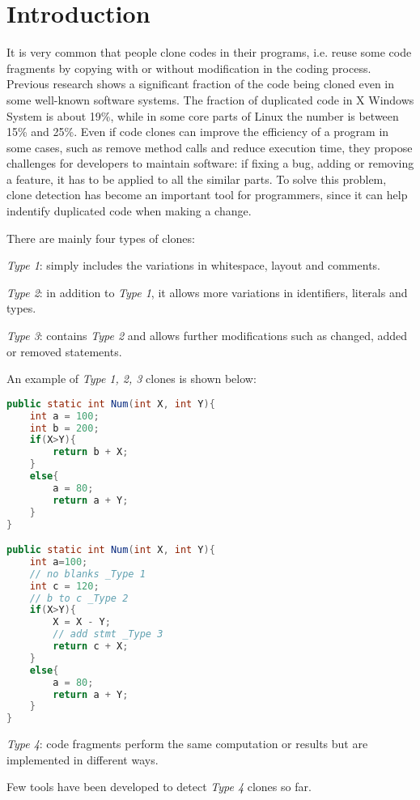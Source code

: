 \documentclass[../main.tex]{subfiles}
\begin{document}
\section{Introduction}

It is very common that people clone codes in their programs, i.e. reuse some code fragments by copying with or without modification in the coding process. 
Previous research shows a significant fraction of the code being cloned even in some well-known software systems. The fraction of duplicated code in X Windows System is about 19\%\cite{cloneinsys1}, while in some core parts of Linux the number is between 15\% and 25\%\cite{cloneinsys2}. 
Even if code clones can improve the efficiency of a program in some cases, such as remove method calls and reduce execution time, they propose challenges for developers to maintain software: if fixing a bug, adding or removing a feature, it has to be applied to all the similar parts. To solve this problem, clone detection has become an important tool for programmers, since it can help indentify duplicated code when making a change.

There are mainly four types of clones:

\indent \emph{Type 1}: simply includes the variations in whitespace, layout and comments.

\indent \emph{Type 2}: in addition to \emph{Type 1}, it allows more variations in identifiers, literals and types.

\indent \emph{Type 3}: contains \emph{Type 2} and allows further modifications such as changed, added or removed statements. 

An example of \emph{Type 1, 2, 3} clones is shown below:  

\begin{lstlisting}[basicstyle=\footnotesize, language=Java]
public static int Num(int X, int Y){
	int a = 100;
	int b = 200;
	if(X>Y){
		return b + X;
	}
	else{
		a = 80;
		return a + Y;
	}
}

public static int Num(int X, int Y){
	int a=100;
	// no blanks _Type 1
	int c = 120;
	// b to c _Type 2
	if(X>Y){
		X = X - Y;
		// add stmt _Type 3
		return c + X;
	}
	else{
		a = 80;
		return a + Y;
	}
}
\end{lstlisting}

\indent \emph{Type 4}: code fragments perform the same computation or results but are implemented in different ways. 

Few tools have been developed to detect \emph{Type 4} clones so far. 
\end{document}
